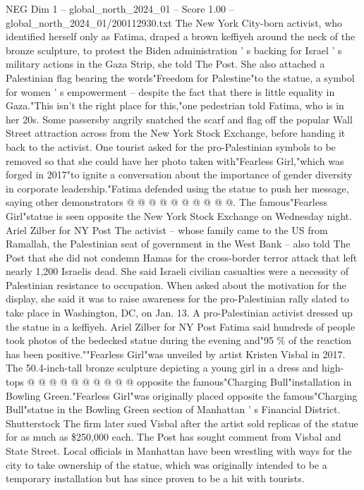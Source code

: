 \begin{textsample}{NEG Dim 1 – global\_north\_2024\_01 – Score 1.00 – global\_north\_2024\_01/200112930.txt}  \label{ex:f1_neg_332}
The New York City-born activist, who identified herself only as Fatima, draped a brown keffiyeh around the neck of the bronze sculpture, to protest the Biden administration ' s backing for Israel ' s military actions in the Gaza Strip, she told The Post.
She also attached a Palestinian flag bearing the words"Freedom for Palestine"to the statue, a symbol for women ' s empowerment -- despite the fact that there is little equality in Gaza."This isn't the right place for this,"one pedestrian told Fatima, who is in her 20s.
Some passersby angrily snatched the scarf and flag off the popular Wall Street attraction across from the New York Stock Exchange, before handing it back to the activist.
One tourist asked for the pro-Palestinian symbols to be removed so that she could have her photo taken with"Fearless Girl,"which was forged in 2017"to ignite a conversation about the importance of gender diversity in corporate leadership."Fatima defended using the statue to push her message, saying other demonstrators @ @ @ @ @ @ @ @ @ @.
The famous"Fearless Girl"statue is seen opposite the New York Stock Exchange on Wednesday night.
Ariel Zilber for NY Post The activist -- whose family came to the US from Ramallah, the Palestinian seat of government in the West Bank -- also told The Post that she did not condemn Hamas for the cross-border terror attack that left nearly 1,200 Israelis dead.
She said Israeli civilian casualties were a necessity of Palestinian resistance to occupation.
When asked about the motivation for the display, she said it was to raise awareness for the pro-Palestinian rally slated to take place in Washington, DC, on Jan. 13.
A pro-Palestinian activist dressed up the statue in a keffiyeh.
Ariel Zilber for NY Post Fatima said hundreds of people took photos of the bedecked statue during the evening and"95 \% of the reaction has been positive.""Fearless Girl"was unveiled by artist Kristen Visbal in 2017.
The 50.4-inch-tall bronze sculpture depicting a young girl in a dress and high-tops @ @ @ @ @ @ @ @ @ @ opposite the famous"Charging Bull"installation in Bowling Green."Fearless Girl"was originally placed opposite the famous"Charging Bull"statue in the Bowling Green section of Manhattan ' s Financial District.
Shutterstock The firm later sued Visbal after the artist sold replicas of the statue for as much as \$250,000 each.
The Post has sought comment from Visbal and State Street.
Local officials in Manhattan have been wrestling with ways for the city to take ownership of the statue, which was originally intended to be a temporary installation but has since proven to be a hit with tourists.

\end{textsample}
